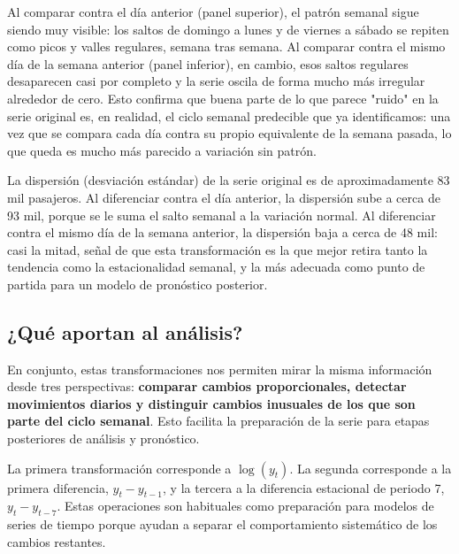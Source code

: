 \documentclass[
  12pt,
  titlepage]{article}
\begin{document}
\begin{hallazgo}
Al comparar contra el día anterior (panel superior), el patrón semanal sigue siendo muy visible: los saltos de domingo a lunes y de viernes a sábado se repiten como picos y valles regulares, semana tras semana. Al comparar contra el mismo día de la semana anterior (panel inferior), en cambio, esos saltos regulares desaparecen casi por completo y la serie oscila de forma mucho más irregular alrededor de cero. Esto confirma que buena parte de lo que parece "ruido" en la serie original es, en realidad, el ciclo semanal predecible que ya identificamos: una vez que se compara cada día contra su propio equivalente de la semana pasada, lo que queda es mucho más parecido a variación sin patrón.
\end{hallazgo}

\begin{notatecnica}
La dispersión (desviación estándar) de la serie original es de aproximadamente 83 mil pasajeros. Al diferenciar contra el día anterior, la dispersión sube a cerca de 93 mil, porque se le suma el salto semanal a la variación normal. Al diferenciar contra el mismo día de la semana anterior, la dispersión baja a cerca de 48 mil: casi la mitad, señal de que esta transformación es la que mejor retira tanto la tendencia como la estacionalidad semanal, y la más adecuada como punto de partida para un modelo de pronóstico posterior.
\end{notatecnica}

\subsection{¿Qué aportan al análisis?}\label{quuxe9-aportan-al-anuxe1lisis}

En conjunto, estas transformaciones nos permiten mirar la misma información desde tres perspectivas: \textbf{comparar cambios proporcionales, detectar movimientos diarios y distinguir cambios inusuales de los que son parte del ciclo semanal}. Esto facilita la preparación de la serie para etapas posteriores de análisis y pronóstico.

\begin{notatecnica}
La primera transformación corresponde a $\log(y_t)$. La segunda corresponde a la primera diferencia, $y_t-y_{t-1}$, y la tercera a la diferencia estacional de periodo 7, $y_t-y_{t-7}$. Estas operaciones son habituales como preparación para modelos de series de tiempo porque ayudan a separar el comportamiento sistemático de los cambios restantes.
\end{notatecnica}
\end{document}
